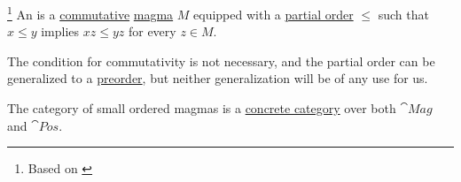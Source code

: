 \begin{definition}\label{def:ordered_magma}\mimprovised\footnote{Based on \cite[224]{Golan2010}}
  An  is a \hyperref[def:magma/commutative]{commutative} \hyperref[def:magma]{magma} \( M \) equipped with a \hyperref[def:partially_ordered_set]{partial order} \( \leq \) such that \( x \leq y \) implies \( xz \leq yz \) for every \( z \in M \).

  The condition for commutativity is not necessary, and the partial order can be generalized to a \hyperref[def:preordered_set]{preorder}, but neither generalization will be of any use for us.

  The category of small ordered magmas is a \hyperref[def:concrete_category]{concrete category} over both \hyperref[def:magma/category]{\( \cat{Mag} \)} and \hyperref[def:partially_ordered_set/category]{\( \cat{Pos} \)}.
\end{definition}

